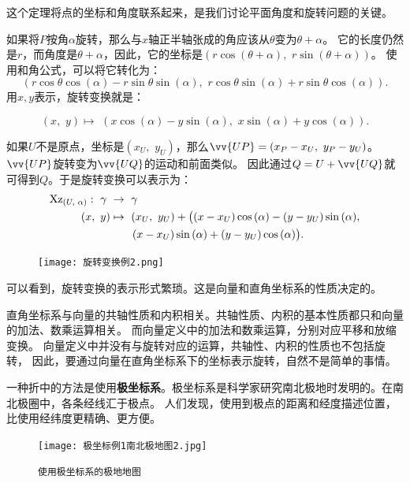 \documentclass[12pt,UTF8]{ctexbook}
\begin{document}
这个定理将点的坐标和角度联系起来，是我们讨论平面角度和旋转问题的关键。 

如果将$P$按角$\alpha$旋转，那么与$x$轴正半轴张成的角应该从$\theta$变为$\theta + \alpha$。
它的长度仍然是$r$，而角度是$\theta + \alpha$，因此，它的坐标是$\left(r\cos{(\theta + \alpha)},\,\,r\sin{(\theta + \alpha)}\right)$。
使用和角公式，可以将它转化为：
$$\left(r\cos{\theta}\cos{(\alpha)} - r\sin{\theta}\sin{(\alpha)},\,\,r\cos{\theta}\sin{(\alpha)} + r\sin{\theta}\cos{(\alpha)}\right).$$
用$x,y$表示，旋转变换就是：

$$ (x,\,\,y) \mapsto \,\, \left(x\cos{(\alpha)} - y\sin{(\alpha)}, \,\,x\sin{(\alpha)} + y\cos{(\alpha)}\right). $$

如果$U$不是原点，坐标是$(x_U, \,\,y_U)$，那么$\vv{UP} = (x_P - x_U, \,\, y_P - y_U)$。$\vv{UP}$旋转变为$\vv{UQ}$的运动和前面类似。
因此通过$Q = U + \vv{UQ}$就可得到$Q$。于是旋转变换可以表示为：
\begin{align}
    \mathrm{Xz}_{(U,\,\,\alpha)} : \,\, \gamma\,\,&\rightarrow  \,\,\gamma \notag \\
    (x,\,\,y)  &\mapsto \,\, (x_U,\,\,y_U) +\big((x - x_U)\cos{(\alpha)} - (y - y_U)\sin{(\alpha)},\notag \\
    &\qquad (x - x_U)\sin{(\alpha)} + (y - y_U)\cos{(\alpha)}\big). \notag
\end{align}

\begin{figure} %
    \vspace{-22pt}
    \flushright
    \texttt{[image: 旋转变换例2.png]}
\end{figure}

可以看到，旋转变换的表示形式繁琐。这是向量和直角坐标系的性质决定的。

直角坐标系与向量的共轴性质和内积相关。共轴性质、内积的基本性质都只和向量的加法、数乘运算相关。
而向量定义中的加法和数乘运算，分别对应平移和放缩变换。
向量定义中并没有与旋转对应的运算，共轴性、内积的性质也不包括旋转，
因此，要通过向量在直角坐标系下的坐标表示旋转，自然不是简单的事情。

一种折中的方法是使用\textbf{极坐标系}。极坐标系是科学家研究南北极地时发明的。在南北极圈中，各条经线汇于极点。
人们发现，使用到极点的距离和经度描述位置，比使用经纬度更精确、更方便。

\begin{figure}[h] %
    \centering
    \texttt{[image: 极坐标例1南北极地图2.jpg]}
    \caption*{\texttt{使用极坐标系的极地地图}}
\end{figure}
\end{document}
